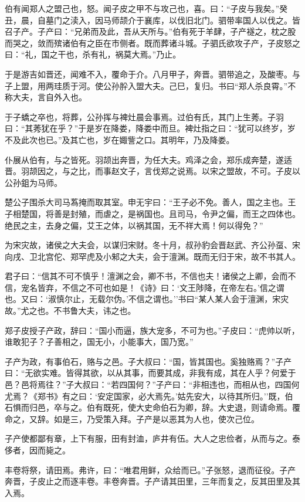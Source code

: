 \documentclass[]{article}
\begin{document}
伯有闻郑人之盟己也，怒。闻子皮之甲不与攻己也，喜。曰：``子皮与我矣。''癸丑，晨，自墓门之渎入，因马师颉介于襄库，以伐旧北门。驷带率国人以伐之。皆召子产。子产曰：``兄弟而及此，吾从天所与。''伯有死于羊肆，子产襚之，枕之股而哭之，敛而殡诸伯有之臣在市侧者。既而葬诸斗城。子驷氏欲攻子产，子皮怒之曰：``礼，国之干也，杀有礼，祸莫大焉。''乃止。

于是游吉如晋还，闻难不入，覆命于介。八月甲子，奔晋。驷带追之，及酸枣。与子上盟，用两珪质于河。使公孙肸入盟大夫。己巳，复归。书曰``郑人杀良霄。''不称大夫，言自外入也。

于子蟜之卒也，将葬，公孙挥与裨灶晨会事焉。过伯有氏，其门上生莠。子羽曰：``其莠犹在乎？''于是岁在降娄，降娄中而旦。裨灶指之曰：``犹可以终岁，岁不及此次也已。''及其亡也，岁在娵訾之口。其明年，乃及降娄。

仆展从伯有，与之皆死。羽颉出奔晋，为任大夫。鸡泽之会，郑乐成奔楚，遂适晋。羽颉因之，与之比，而事赵文子，言伐郑之说焉。以宋之盟故，不可。子皮以公孙鉏为马师。

楚公子围杀大司马蒍掩而取其室。申无宇曰：``王子必不免。善人，国之主也。王子相楚国，将善是封殖，而虐之，是祸国也。且司马，令尹之偏，而王之四体也。绝民之主，去身之偏，艾王之体，以祸其国，无不祥大焉！何以得免？''

为宋灾故，诸侯之大夫会，以谋归宋财。冬十月，叔孙豹会晋赵武、齐公孙虿、宋向戌、卫北宫佗、郑罕虎及小邾之大夫，会于澶渊。既而无归于宋，故不书其人。

君子曰：``信其不可不慎乎！澶渊之会，卿不书，不信也夫！诸侯之上卿，会而不信，宠名皆弃，不信之不可也如是！《诗》曰：`文王陟降，在帝左右。'信之谓也。又曰：`淑慎尔止，无载尔伪。'不信之谓也。''书曰``某人某人会于澶渊，宋灾故。''尤之也。不书鲁大夫，讳之也。

郑子皮授子产政，辞曰：``国小而逼，族大宠多，不可为也。''子皮曰：``虎帅以听，谁敢犯子？子善相之，国无小，小能事大，国乃宽。''

子产为政，有事伯石，赂与之邑。子大叔曰：``国，皆其国也。奚独赂焉？''子产曰：``无欲实难。皆得其欲，以从其事，而要其成，非我有成，其在人乎？何爱于邑？邑将焉往？''子大叔曰：``若四国何？''子产曰：``非相违也，而相从也，四国何尤焉？《郑书》有之曰：`安定国家，必大焉先。'姑先安大，以待其所归。''既，伯石惧而归邑，卒与之。伯有既死，使大史命伯石为卿，辞。大史退，则请命焉。覆命之，又辞。如是三，乃受策入拜。子产是以恶其为人也，使次己位。

子产使都鄙有章，上下有服，田有封洫，庐井有伍。大人之忠俭者，从而与之。泰侈者，因而毙之。

丰卷将祭，请田焉。弗许，曰：``唯君用鲜，众给而已。''子张怒，退而征役。子产奔晋，子皮止之而逐丰卷。丰卷奔晋。子产请其田里，三年而复之，反其田里及其入焉。
\end{document}
